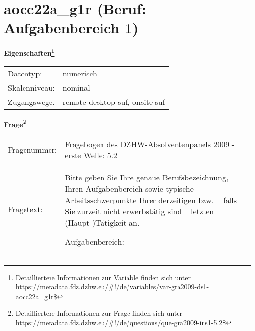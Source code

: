 
    \setcounter{footnote}{0}

    \vspace*{-1.8cm}
	\section{aocc22a\_g1r (Beruf: Aufgabenbereich 1)}
	\label{section:aocc22a_g1r}



    \vspace*{0.5cm}
    \noindent\textbf{Eigenschaften\footnote{Detailliertere Informationen zur Variable finden sich unter
		\url{https://metadata.fdz.dzhw.eu/\#!/de/variables/var-gra2009-ds1-aocc22a_g1r$}}}\\
	\begin{tabularx}{\hsize}{@{}lX}
	Datentyp: & numerisch \\
	Skalenniveau: & nominal \\
	Zugangswege: &
	  remote-desktop-suf, 
	  onsite-suf
 \\
    \end{tabularx}



				\vspace*{0.5cm}
                \noindent\textbf{Frage\footnote{Detailliertere Informationen zur Frage finden sich unter
		              \url{https://metadata.fdz.dzhw.eu/\#!/de/questions/que-gra2009-ins1-5.2$}}}\\
				\begin{tabularx}{\hsize}{@{}lX}
					Fragenummer: &
					  Fragebogen des DZHW-Absolventenpanels 2009 - erste Welle:
					  5.2
 \\
					Fragetext: & Bitte geben Sie Ihre genaue Berufsbezeichnung, Ihren Aufgabenbereich sowie typische Arbeitsschwerpunkte Ihrer derzeitigen bzw. – falls Sie zurzeit nicht erwerbstätig sind – letzten (Haupt-)Tätigkeit an.\par  Aufgabenbereich: \\
				\end{tabularx}





